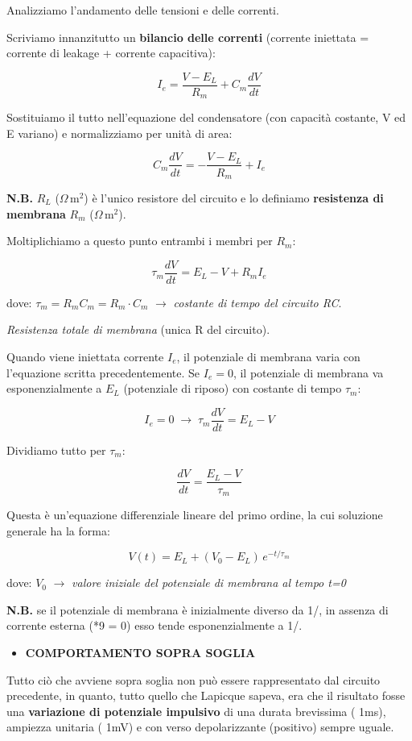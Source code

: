 \documentclass[12pt,a4paper,openany]{book}
\begin{document}
Analizziamo l'andamento delle tensioni e delle correnti.

Scriviamo innanzitutto un \textbf{bilancio delle correnti} (corrente iniettata = corrente di leakage + corrente capacitiva):

\[
I_e = \frac{V - E_L}{R_m} + C_m \frac{dV}{dt}
\]

Sostituiamo il tutto nell'equazione del condensatore (con capacità costante, V ed E variano) e normalizziamo per unità di area:

\[
C_m \frac{dV}{dt} = -\frac{V - E_L}{R_m} + I_e
\]

\textbf{N.B.} $R_L$ ($\Omega\,\text{m}^2$) è l'unico resistore del circuito e lo definiamo \textbf{resistenza di membrana} $R_m$ ($\Omega\,\text{m}^2$).

Moltiplichiamo a questo punto entrambi i membri per $R_m$:

\[
\tau_m \frac{dV}{dt} = E_L - V + R_m I_e
\]

dove: $\tau_m = R_m C_m = R_m \cdot C_m$ $\rightarrow$ \textit{costante di tempo del circuito RC}.

\textit{Resistenza totale di membrana} (unica R del circuito).

Quando viene iniettata corrente $I_e$, il potenziale di membrana varia con l'equazione scritta precedentemente. Se $I_e = 0$, il potenziale di membrana va esponenzialmente a $E_L$ (potenziale di riposo) con costante di tempo $\tau_m$:

\[
I_e = 0 \;\rightarrow\; \tau_m \frac{dV}{dt} = E_L - V
\]

Dividiamo tutto per $\tau_m$:

\[
\frac{dV}{dt} = \frac{E_L - V}{\tau_m}
\]

Questa è un'equazione differenziale lineare del primo ordine, la cui soluzione generale ha la forma:

\[
V(t) = E_L + (V_0 - E_L)\,e^{-t/\tau_m}
\]

dove: $V_0$ $\rightarrow$ \textit{valore iniziale del potenziale di membrana al tempo t=0}

\textbf{N.B. }se il potenziale di membrana è inizialmente diverso da 1/, in assenza di corrente esterna (*9 = 0) esso tende esponenzialmente a 1/.

\begin{itemize}
  \item \textbf{COMPORTAMENTO SOPRA SOGLIA}
\end{itemize}
Tutto ciò che avviene sopra soglia non può essere rappresentato dal circuito precedente, in quanto, tutto quello che Lapicque sapeva, era che il risultato fosse una \textbf{variazione di potenziale impulsivo }di una durata brevissima ( 1ms), ampiezza unitaria ( 1mV) e con verso depolarizzante (positivo) sempre uguale.
\end{document}
